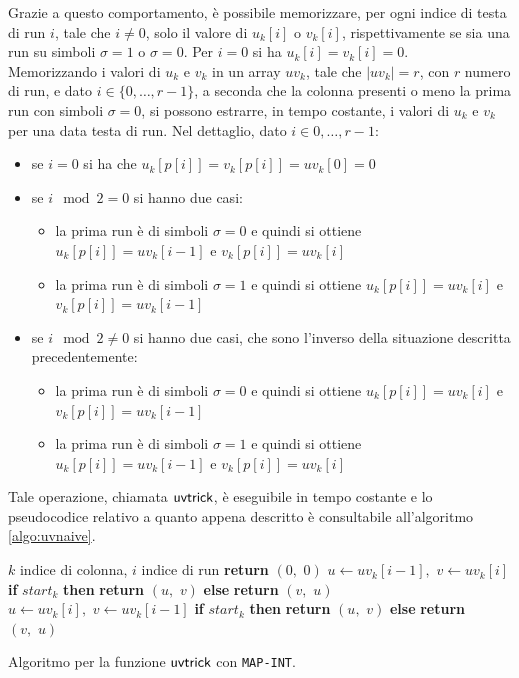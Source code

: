 Grazie a questo comportamento, è possibile memorizzare, per ogni indice di
testa di run $i$, tale che $i\neq 0$, solo il valore di $u_k[i]$ o $v_k[i]$,
rispettivamente se sia una run su simboli $\sigma=1$ o $\sigma=0$.
Per $i=0$ si ha $u_k[i]=v_k[i]=0$.\\
Memorizzando i valori di $u_k$ e $v_k$ in un array $uv_k$, tale che $|uv_k|=r$,
con $r$ numero di run, e dato $i\in\{0,\ldots, r-1\}$, a seconda che la colonna
presenti o meno la prima run  
con simboli $\sigma=0$, si possono estrarre, in tempo costante, i valori di
$u_k$ e $v_k$ per una data testa di run. Nel dettaglio, dato $i\in{0,\ldots,
  r-1}$:
\begin{itemize}
  \item se $i=0$ si ha che $u_k[p[i]]=v_k[p[i]]=uv_k[0]=0$
  \item se $i\mod 2 =0$ si hanno due casi:
  \begin{itemize}
    \item la prima run è di simboli $\sigma=0$ e quindi si ottiene
    $u_k[p[i]]=uv_k[i-1]$ e $v_k[p[i]]=uv_k[i]$
    \item la prima run è di simboli $\sigma=1$ e quindi si ottiene
    $u_k[p[i]]=uv_k[i]$ e $v_k[p[i]]=uv_k[i-1]$
  \end{itemize}
  \item se $i\mod 2 \neq 0$ si hanno due casi, che sono l'inverso della
  situazione descritta precedentemente:
  \begin{itemize}
    \item la prima run è di simboli $\sigma=0$ e quindi si ottiene
    $u_k[p[i]]=uv_k[i]$ e $v_k[p[i]]=uv_k[i-1]$
    \item la prima run è di simboli $\sigma=1$ e quindi si ottiene
    $u_k[p[i]]=uv_k[i-1]$ e $v_k[p[i]]=uv_k[i]$   
  \end{itemize}
\end{itemize}
Tale operazione, chiamata $\mbox{\rm {\sf uvtrick}}$, è eseguibile in tempo costante e lo
pseudocodice relativo a 
quanto appena descritto è consultabile all'algoritmo \ref{algo:uvnaive}.
\begin{algorithm}
  \small
  \begin{algorithmic}[1]
    \Comment $k$ indice di colonna, $i$ indice di run
    \State \textbf{return} $(0,\,\,0)$
    \State $u\gets uv_k[i-1],\,\,v\gets uv_k[i]$
    \State \textbf{if} $start_k$ \textbf{then} \textbf{return} $(u,\,\,v)$
    \textbf{else} 
    \textbf{return} $(v,\,\,u)$
    \Else
    \State $u\gets uv_k[i],\,\,v\gets uv_k[i-1]$
    \State \textbf{if} $start_k$ \textbf{then} \textbf{return} $(u,\,\,v)$
    \textbf{else} 
    \textbf{return} $(v,\,\,u)$
    \EndIf
    \EndFunction
  \end{algorithmic}
  \caption{Algoritmo per la funzione $\mbox{\rm {\sf uvtrick}}$ con \texttt{MAP-INT}.}
  \label{algo:uvnaive}
\end{algorithm}

